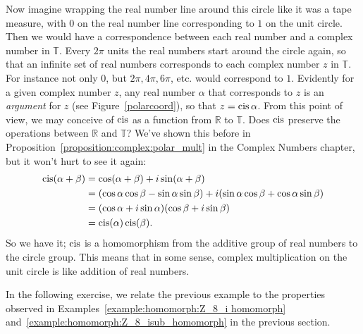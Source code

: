 \begin{example}
\noindent
Now imagine wrapping the real number line around this circle like it was a tape measure, with $0$ on the real number line corresponding to $1$ on the unit circle.  Then we would have a correspondence between each real number and a complex number in ${ \mathbb T}$. Every $2\pi$ units the real numbers start around the circle again, so that an infinite set of real numbers corresponds to each complex number $z$ in ${ \mathbb T}$.  For instance not only 0, but $2\pi, 4\pi, 6\pi$, etc. would correspond to $1$.  
Evidently for a given complex number $z$, any real number $\alpha$ that corresponds to $z$ is an \emph{argument} for $z$ (see Figure~\ref{polarcoord}), so that $z = \operatorname{cis} \alpha$.
From this point of view, we may conceive of $\operatorname{cis}$ as  a function from ${ \mathbb R}$ to  ${ \mathbb T}$.   Does $\operatorname{cis}$ preserve the operations between ${ \mathbb R}$ and ${ \mathbb T}$? We've shown this before in Proposition~\ref{proposition:complex:polar_mult} in the Complex Numbers chapter, but it won't hurt to see it again:
\begin{align*}
\operatorname{cis}( \alpha + \beta )
& =
\cos( \alpha + \beta ) + i \sin( \alpha + \beta ) \\
& =
(\cos \alpha \cos \beta - \sin \alpha \sin \beta)  + i( \sin \alpha 
\cos \beta + \cos \alpha \sin \beta ) \\
& =
(\cos \alpha + i \sin \alpha )(\cos \beta + i \sin \beta
) \\
& = \operatorname{cis}( \alpha ) \operatorname{cis}( \beta ).
\end{align*}
So we have it; $\operatorname{cis}$ is a homomorphism from the additive group of real numbers to the circle group.
This means that in some sense, complex multiplication on the unit circle is like addition of real numbers.
\end{example}


In the following exercise, we relate the previous example to the properties observed in  Examples~\ref{example:homomorph:Z_8_i homomorph} and~\ref{example:homomorph:Z_8_isub_homomorph} in the previous section.

